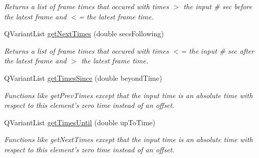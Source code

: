 \begin{DoxyCompactItemize}
\begin{DoxyCompactList}\small\item\em Returns a list of frame times that occured with times $>$ the input \# sec before the latest frame and $<$= the latest frame time. \end{DoxyCompactList}\item 
\hypertarget{class_picto_1_1_analysis_frame_data_ae53e04fbf3a6b1fbafccceaee385d690}{Q\-Variant\-List \hyperlink{class_picto_1_1_analysis_frame_data_ae53e04fbf3a6b1fbafccceaee385d690}{get\-Next\-Times} (double secs\-Following)}\label{class_picto_1_1_analysis_frame_data_ae53e04fbf3a6b1fbafccceaee385d690}

\begin{DoxyCompactList}\small\item\em Returns a list of frame times that occured with times $<$= the input \# sec after the latest frame and $>$ the latest frame time. \end{DoxyCompactList}\item 
\hypertarget{class_picto_1_1_analysis_frame_data_a6ed4b1e4293f4183c148330afd01fbfd}{Q\-Variant\-List \hyperlink{class_picto_1_1_analysis_frame_data_a6ed4b1e4293f4183c148330afd01fbfd}{get\-Times\-Since} (double beyond\-Time)}\label{class_picto_1_1_analysis_frame_data_a6ed4b1e4293f4183c148330afd01fbfd}

\begin{DoxyCompactList}\small\item\em Functions like get\-Prev\-Times except that the input time is an absolute time with respect to this element's zero time instead of an offset. \end{DoxyCompactList}\item 
\hypertarget{class_picto_1_1_analysis_frame_data_ac4111ab60a34cacf3f87c40c49c834a9}{Q\-Variant\-List \hyperlink{class_picto_1_1_analysis_frame_data_ac4111ab60a34cacf3f87c40c49c834a9}{get\-Times\-Until} (double up\-To\-Time)}\label{class_picto_1_1_analysis_frame_data_ac4111ab60a34cacf3f87c40c49c834a9}

\begin{DoxyCompactList}\small\item\em Functions like get\-Next\-Times except that the input time is an absolute time with respect to this element's zero time instead of an offset. \end{DoxyCompactList}\end{DoxyCompactItemize}
